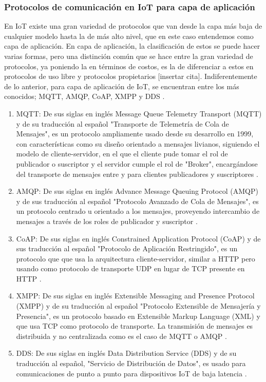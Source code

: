 \documentclass[stu,12pt,floatsintext]{apa7}
\begin{document}
	\subsubsection{Protocolos de comunicación en IoT para capa de aplicación}
	En IoT existe una gran variedad de protocolos que van desde la capa más baja de cualquier modelo hasta la de más alto nivel, que en este caso entendemos como capa de aplicación. En capa de aplicación, la clasificación de estos se puede hacer varias formas, pero una distinción común que se hace entre la gran variedad de protocolos, ya poniendo la en términos de costos, es la de diferenciar a estos en protocolos de uso libre y protocolos propietarios [insertar cita].
	Indiferentemente de lo anterior, para capa de aplicación de IoT, se encuentran entre los más conocidos; MQTT, AMQP, CoAP, XMPP y DDS \cite{YUGHA2020102763}.
	\begin{enumerate}[label=\alph*)]
	\item MQTT: De sus siglas en inglés Message Queue Telemetry Transport (MQTT) y de su traducción al español "Transporte de Telemetría de Cola de Mensajes", es un protocolo ampliamente usado desde su desarrollo en 1999, con características como su diseño orientado a mensajes livianos, siguiendo el modelo de cliente-servidor, en el que el cliente pude tomar el rol de publicador o suscriptor y el servidor cumple el rol de "Broker", encargándose del transporte de mensajes entre y para clientes publicadores y suscriptores \cite{EEI5236}.
	\item AMQP: De sus siglas en inglés Advance Message Queuing Protocol (AMQP) y de sus traducción al español "Protocolo Avanzado de Cola de Mensajes", es un protocolo centrado u orientado a los mensajes, proveyendo intercambio de mensajes a través de los roles de publicador y suscriptor \cite{YUGHA2020102763}.
	\item CoAP: De sus siglas en inglés Constrained Application Protocol (CoAP) y de sus traducción al español "Protocolo de Aplicación Restringido", es un protocolo que que usa la arquitectura cliente-servidor, similar a HTTP pero usando como protocolo de transporte UDP en lugar de TCP presente en HTTP \cite{YUGHA2020102763}.
	\item XMPP: De sus siglas en inglés Extensible Messaging and Presence Protocol (XMPP) y de su traducción al español "Protocolo Extensible de Mensajería y Presencia", es un protocolo basado en  Extensible Markup Language (XML) y que usa TCP como protocolo de transporte. La transmisión de mensajes es distribuida y no centralizada como es el caso de MQTT o AMQP \cite{YUGHA2020102763}.
	\item DDS: De sus siglas en inglés Data Distribution Service (DDS) y de su traducción al español, "Servicio de Distribución de Datos", es usado para comunicaciones de punto a punto para dispositivos IoT de baja latencia \cite{YUGHA2020102763}.
	\end{enumerate}
	
\end{document}
